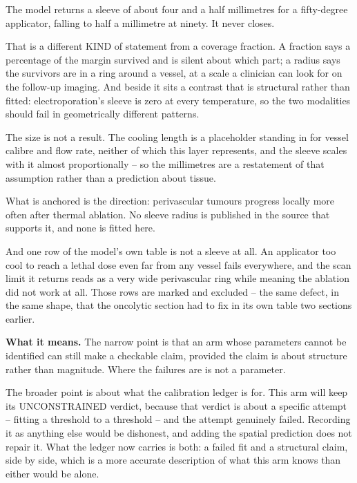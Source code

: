 \documentclass[11pt,twoside,openright]{report}
\begin{document}
\begin{finding}
The model returns a sleeve of about four and a half millimetres for a fifty-degree applicator, falling to half a millimetre at ninety. It never closes.

That is a different KIND of statement from a coverage fraction. A fraction says a percentage of the margin survived and is silent about which part; a radius says the survivors are in a ring around a vessel, at a scale a clinician can look for on the follow-up imaging. And beside it sits a contrast that is structural rather than fitted: electroporation's sleeve is zero at every temperature, so the two modalities should fail in geometrically different patterns.
\end{finding}

\begin{refusal}
The size is not a result. The cooling length is a placeholder standing in for vessel calibre and flow rate, neither of which this layer represents, and the sleeve scales with it almost proportionally -- so the millimetres are a restatement of that assumption rather than a prediction about tissue.

What is anchored is the direction: perivascular tumours progress locally more often after thermal ablation. No sleeve radius is published in the source that supports it, and none is fitted here.

And one row of the model's own table is not a sleeve at all. An applicator too cool to reach a lethal dose even far from any vessel fails everywhere, and the scan limit it returns reads as a very wide perivascular ring while meaning the ablation did not work at all. Those rows are marked and excluded -- the same defect, in the same shape, that the oncolytic section had to fix in its own table two sections earlier.
\end{refusal}

\textbf{What it means.} The narrow point is that an arm whose parameters cannot be identified can still make a checkable claim, provided the claim is about structure rather than magnitude. Where the failures are is not a parameter.

The broader point is about what the calibration ledger is for. This arm will keep its UNCONSTRAINED verdict, because that verdict is about a specific attempt -- fitting a threshold to a threshold -- and the attempt genuinely failed. Recording it as anything else would be dishonest, and adding the spatial prediction does not repair it. What the ledger now carries is both: a failed fit and a structural claim, side by side, which is a more accurate description of what this arm knows than either would be alone.
\end{document}
